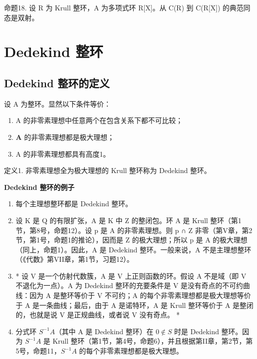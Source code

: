 命题18. 设 R 为 Krull 整环，A 为多项式环 R{[}X{]}。从 C(R) 到 C(R{[}X{]}) 的典范同态是双射。

\section{Dedekind 整环}

\subsection{Dedekind 整环的定义}

设 A 为整环。显然以下条件等价：

\begin{enumerate}
\def\labelenumi{(\alph{enumi})}
\item
  A 的非零素理想中任意两个在包含关系下都不可比较；
\item
  \(\mathbf{A}\) 的非零素理想都是极大理想；
\item
  A 的非零素理想都具有高度1。
\end{enumerate}

定义1. 非零素理想全为极大理想的 Krull 整环称为 Dedekind 整环。

\textbf{Dedekind 整环的例子}\par

\begin{enumerate}
\def\labelenumi{(\arabic{enumi})}
\item
  每个主理想整环都是 Dedekind 整环。
\item
  设 K 是 Q 的有限扩张，A 是 K 中 Z 的整闭包。环 A 是 Krull 整环（第1节，第8号，命题12）。设 p 是 A 的非零素理想。则 p ∩ Z 非零（第V章，第2节，第1号，命题1的推论），因而是 Z 的极大理想；所以 p 是 A 的极大理想（同上，命题1）。因此，A 是 Dedekind 整环。一般来说，A 不是主理想整环（《代数》第VII章，第1节，习题12）。
\item
  * 设 V 是一个仿射代数簇，A 是 V 上正则函数的环。假设 A 不是域（即 V 不退化为一点）。A 为 Dedekind 整环的充要条件是 V 是没有奇点的不可约曲线：因为 A 是整环等价于 V 不可约；A 的每个非零素理想都是极大理想等价于 A 是一条曲线；最后，由于 A 是诺特环，A 是 Krull 整环等价于 A 是整闭的，也就是说 V 是正规曲线，或者说 V 没有奇点。 *
\item
  分式环 \(S^{-1}A\)（其中 A 是 Dedekind 整环）在 \(0 \notin S\) 时是 Dedekind 整环。因为 \(S^{-1}A\) 是 Krull 整环（第1节，第4号，命题6），并且根据第II章，第2节，第5号，命题11，\(S^{-1}A\) 的每个非零素理想都是极大理想。
\end{enumerate}

